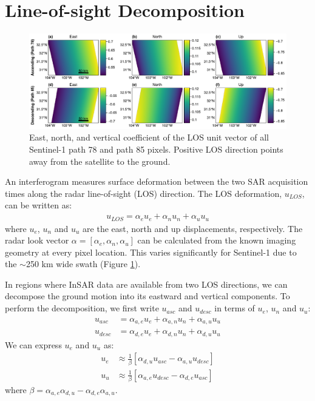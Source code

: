 \section{Line-of-sight Decomposition}
\label{sec:ch2-insar-decomp}


\begin{figure}
	\centering
	\includegraphics[width=.98\textwidth]{figures/chapter2-sar/figure_los_enu_coeffs.pdf}
	\caption[East, north, and vertical coefficients of Sentinel-1 LOS vectors]{East, north, and vertical coefficient of the LOS unit vector of all Sentinel-1 path 78 and path 85 pixels. Positive LOS direction points away from the satellite to the ground.
	}
	\label{fig:los-map}
\end{figure}

An interferogram measures surface deformation between the two SAR acquisition times along the radar line-of-sight (LOS) direction. The LOS deformation, $u_{LOS}$, can be written as: 
\begin{align}
	u_{LOS}= \alpha_{e} u_{e} + \alpha_{n} u_{n} + \alpha_{u} u_{u}
\end{align}
where $u_{e}$, $u_{n}$ and $u_{u}$ are the east, north and up displacements, respectively. The radar look vector $\alpha = [\alpha_e, \alpha_n, \alpha_u]$ can be calculated from the known imaging geometry at every pixel location. This varies significantly for Sentinel-1 due to the $ \sim$250 km wide swath (Figure \ref{fig:los-map}). 


In regions where InSAR data are available from two LOS directions, we can decompose the ground motion into its eastward and vertical components.
To perform the decomposition, we first write $u_{asc}$ and $u_{desc}$ in terms of $u_e$, $u_n$ and $u_u$:
\begin{align}
	u_{asc} &= \alpha_{a,e} u_{e} + \alpha_{a,n} u_{n} + \alpha_{a,u} u_{u}\\
	u_{desc} &= \alpha_{d,e} u_{e} + \alpha_{d,n} u_{n} + \alpha_{d,u} u_{u}
\end{align}
We can express $u_e$ and $u_u$ as:
\begin{align}
	u_{e} &\approx  \frac{1}{\beta}  \left[\alpha_{d,u}  u_{asc} - \alpha_{a,u} u_{desc} \right] \\
	u_{u} &\approx  \frac{1}{\beta}  \left[\alpha_{a,e} u_{desc} - \alpha_{d,e}  u_{asc}  \right] 
\end{align}
where  $ \beta = {\alpha_{a,e} \alpha_{d,u}- \alpha_{d,e} \alpha_{a,u}} $.




